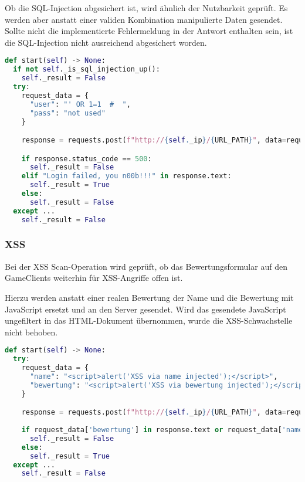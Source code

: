 Ob die SQL-Injection abgesichert ist, wird ähnlich der Nutzbarkeit geprüft. Es werden aber anstatt einer validen Kombination manipulierte Daten gesendet. Sollte nicht die implementierte Fehlermeldung  in der Antwort enthalten sein, ist die SQL-Injection nicht ausreichend abgesichert worden.

\begin{lstlisting}[language=Python, frame=single, caption={Big Brother SQL-Injection Save}, captionpos=b, label={lst:bigbrother-sql-injection-save}]
def start(self) -> None:
  if not self._is_sql_injection_up():
    self._result = False
  try:
    request_data = {
      "user": "' OR 1=1  #  ",
      "pass": "not used"
    }

    response = requests.post(f"http://{self._ip}/{URL_PATH}", data=request_data)

    if response.status_code == 500:
      self._result = False
    elif "Login failed, you n00b!!!" in response.text:
      self._result = True
    else:
      self._result = False
  except ...
    self._result = False
\end{lstlisting}

\subsubsection{XSS}
Bei der XSS Scan-Operation wird geprüft, ob das Bewertungsformular auf den GameClients weiterhin für XSS-Angriffe offen ist.

Hierzu werden anstatt einer realen Bewertung der Name und die Bewertung mit JavaScript ersetzt und an den Server gesendet. Wird das gesendete JavaScript ungefiltert in das HTML-Dokument übernommen, wurde die XSS-Schwachstelle nicht behoben.
\begin{lstlisting}[language=Python, frame=single, caption={Big Brother XSS Save}, captionpos=b, label={lst:bigbrother-xss-save}]
def start(self) -> None:
  try:
    request_data = {
      "name": "<script>alert('XSS via name injected');</script>",
      "bewertung": "<script>alert('XSS via bewertung injected');</script>"
    }

    response = requests.post(f"http://{self._ip}/{URL_PATH}", data=request_data)
    
    if request_data['bewertung'] in response.text or request_data['name'] in response.text:
      self._result = False
    else:
      self._result = True
  except ...
    self._result = False
\end{lstlisting}

